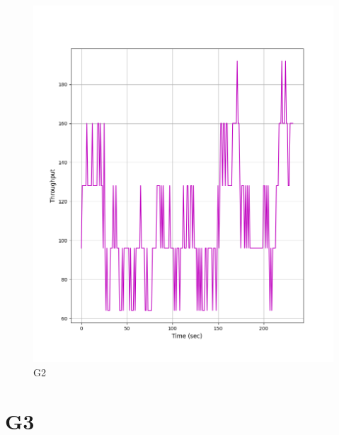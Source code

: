 \documentclass[hidelinks, 12pt, a4paper]{article}
\begin{document}
\begin{figure}[h!]
\centering
	\includegraphics[height=.4\textheight, width=\textwidth]{assets/session1/g2.png}
	\caption{G2} 
\end{figure}

\section{G3}
\end{document}
